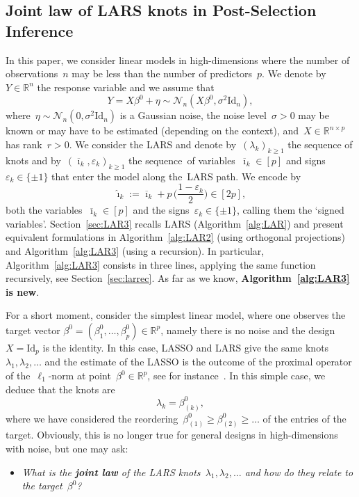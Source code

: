 \documentclass[final,numbib]{imaiai}%
\numberwithin{equation}{section}
\def\eq{\begin{equation}}
\def\qe{\end{equation}}
\renewcommand{\bar}{\overline}
\newcommand{\<}{\langle}
\renewcommand{\>}{\rangle}
\newcommand{\1}{\mathds{1}}
\begin{document}
\subsection{Joint law of LARS knots in Post-Selection Inference}
\label{sec:Q1}
In this paper, we consider linear models in high-dimensions where the number of observations~$n$ may be less than the number of predictors~$p$.
We denote by~$Y\in\mathbb R^n$ the response variable and we assume that
\eq
\label{eq:LinModel}
Y=X\beta^0+\eta\sim\mathcal N_n(X\beta^0,\sigma^2 \mathrm{Id}_n),
\qe
where~$\eta\sim\mathcal N_n(0,\sigma^2 \mathrm{Id}_n)$ is a Gaussian noise, the noise level~$\sigma>0$ may be known or may have to be estimated (depending on the context), and~$X\in\mathds R^{n\times p}$ has rank~$r>0$. We consider the LARS and denote by~$(\lambda_k)_{k\geq1}$ the sequence of knots and by~$(\bar \imath_k,\varepsilon_k)_{k\geq1}$ the sequence~of variables~$\bar \imath_k\in[p]$ and signs~$\varepsilon_k\in\{\pm1\}$ that enter the model along the~LARS path.
We encode by 
\[
\widehat\imath_k:=\bar \imath_k+p\,\Big(\frac{1-\varepsilon_k}2\Big)\in[2p],
\]
both  the variables~$\bar \imath_k\in[p]$ and the signs~$\varepsilon_k\in\{\pm1\}$, calling them the `signed variables'\!. Section~\ref{sec:LAR3} recalls LARS (Algorithm~\ref{alg:LAR}) and present equivalent formulations in Algorithm~\ref{alg:LAR2} (using orthogonal projections) and Algorithm~\ref{alg:LAR3} (using a recursion). In particular, Algorithm~\ref{alg:LAR3} consists in three lines, applying the same function recursively, see Section~\ref{sec:larrec}. As far as we know, {\bf Algorithm~\ref{alg:LAR3} is new}. 

For a short moment, consider the simplest linear model, where one observes the target vector $\beta^0=(\beta^0_1,\ldots,\beta^0_p)\in\mathds R^p$, namely there is no noise and the design~$X=\mathrm{Id}_p$ is the identity.
In this case, LASSO and LARS give the same knots~$\lambda_1,\lambda_2,\ldots$  and the estimate of the LASSO is the outcome of the proximal operator of the~$\ell_1$-norm at point~$\beta^0\in\mathds R^p$, see for instance~\cite[Chapter 2]{hastie2015statistical}.
In this simple case, we deduce that the knots are 
\eq
\label{eq_simplest}
\lambda_k=\beta^0_{(k)},
\qe
where we have considered the reordering~$\beta^0_{(1)}\geq\beta^0_{(2)}\geq\ldots$ of the entries of the target.
Obviously, this is no longer true for general designs in high-dimensions with noise, but one may ask:
\begin{itemize}
\item[\bf{[Q1]}]
{\it 
What is the {\bf joint law} of the LARS knots~$\lambda_1,\lambda_2,\ldots$ and how do they relate to the target~$\beta^0$?}
\end{itemize}
\end{document}
